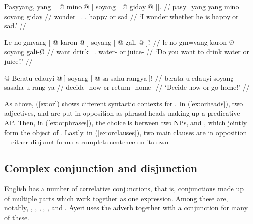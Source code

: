 \pex\label{ex:or}
\a\label{ex:orheads}\begingl
	\gla Pasyyang, yāng {\normalfont [[} @ mino @ 
		{\normalfont ]} soyang {\normalfont [} @ giday @ 
		{\normalfont ]].} //
	\glb pasy=yang yāng {} mino {} soyang {} giday {} //
	\glc wonder=\Fsg{}.\Aarg{} \TsgM{}.\Aarg{} {} happy {} or {} sad {} //
	\glft `I wonder whether he is happy or sad.' //
\endgl

\a\label{ex:orphrases}\begingl
	\gla Le no ginvāng {\normalfont [} @ karon @ {\normalfont ]} 
		soyang {\normalfont [} @ gali @ {\normalfont ]?} //
	\glb le no gin=vāng {} karon-Ø {} soyang {} gali-Ø {} //
	\glc \PatTI{} want drink=\Second{}.\Aarg{} {} water-\Top{} {} or {} 
		juice-\Top{} {} //
	\glft `Do you want to drink water or juice?' //
\endgl

\a\label{ex:orclauses}\begingl
	\gla {\normalfont [\tsup{S}} @ Beratu edauyi @ {\normalfont ]} soyang
		{\normalfont [} @ sa-sahu rangya {\normalfont ]!} //
	\glb {} berata-u edauyi {} soyang {} sa\til{}saha-u rang-ya {} //
	\glc {} decide-\Imp{} now {} or {} return-\Imp{} home-\Loc{} {} //
	\glft `Decide now or go home!' //
\endgl

\xe

As above, (\ref{ex:or}) shows different syntactic contexts for 
. In (\ref{ex:orheads}), two adjectives, 
 and  are put in opposition as
phrasal heads making up a predicative AP. Then, in (\ref{ex:orphrases}), the
choice is between two NPs,  and
, which jointly form the object of 
. Lastly, in (\ref{ex:orclauses}), two main 
clauses are in opposition---either disjunct forms a complete sentence on its 
own.


\subsection{Complex conjunction and disjunction}
\label{subsec:corrconj}

English has a number of correlative conjunctions, that is, conjunctions made up
of multiple parts which work together as one expression. Among these are,
notably,
,
,
,
,
, and
.
Ayeri uses the adverb  together with a 
conjunction for many of these.

